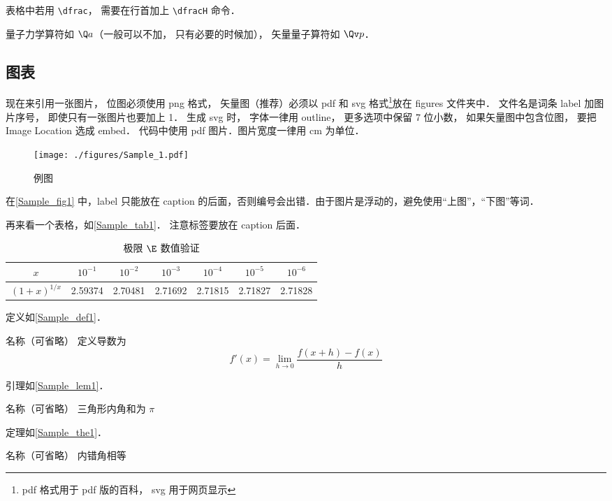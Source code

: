 表格中若用 \verb|\dfrac|， 需要在行首加上 \verb|\dfracH| 命令．%

量子力学算符如 $\Q a$（一般可以不加， 只有必要的时候加）， 矢量量子算符如 $\Qv p$．

\subsection{图表}

现在来引用一张图片， 位图必须使用 png 格式， 矢量图（推荐）必须以 pdf 和 svg 格式\footnote{pdf 格式用于 pdf 版的百科， svg 用于网页显示}放在 figures 文件夹中． 文件名是词条 label 加图片序号， 即使只有一张图片也要加上 1． 生成 svg 时， 字体一律用 outline， 更多选项中保留 7 位小数， 如果矢量图中包含位图， 要把 Image Location 选成 embed． 代码中使用 pdf 图片．图片宽度一律用 cm 为单位．
\begin{figure}[ht]
\centering
\texttt{[image: ./figures/Sample\_1.pdf]}
\caption{例图} \label{Sample_fig1}
\end{figure}
在\autoref{Sample_fig1} 中，label 只能放在 caption 的后面，否则编号会出错．由于图片是浮动的，避免使用“上图”，“下图”等词．

再来看一个表格，如\autoref{Sample_tab1}． 注意标签要放在 caption 后面．
\begin{table}[ht]
\centering
\caption{极限 $\E$ 数值验证}\label{Sample_tab1}
\begin{tabular}{|c|c|c|c|c|c|c|}
\hline
$x$ & ${10^{ - 1}}$ & ${10^{ - 2}}$ & ${10^{ - 3}}$ & ${10^{ - 4}}$ & ${10^{ - 5}}$ & ${10^{ - 6}}$ \\
\hline
$(1 + x)^{1/x}$ & 2.59374 & 2.70481 & 2.71692 & 2.71815 & 2.71827 & 2.71828 \\
\hline
\end{tabular}
\end{table}

定义如\autoref{Sample_def1}．
\begin{definition}{名称（可省略）}\label{Sample_def1}
 定义导数为
\begin{equation}
f'(x) = \lim_{h \to 0} \frac{f(x + h) - f(x)}{h}
\end{equation}
\end{definition}

引理如\autoref{Sample_lem1}．
\begin{lemma}{名称（可省略）}\label{Sample_lem1}
三角形内角和为 $\pi$
\end{lemma}

定理如\autoref{Sample_the1}．
\begin{theorem}{名称（可省略）}\label{Sample_the1}
内错角相等
\end{theorem}

